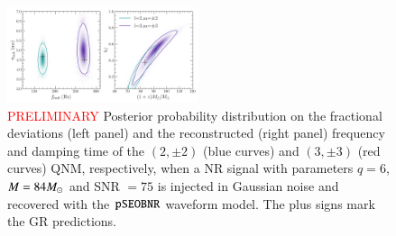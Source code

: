 
\begin{figure}
        \includegraphics[width=0.5\textwidth]{figures/nohair_sxs_0166.png}
        \caption{\textcolor{red}{PRELIMINARY} Posterior probability distribution on the fractional deviations (left panel) and the reconstructed (right panel) frequency and damping time of the $(2,\pm 2)$ (blue curves) and $(3,\pm 3)$ (red curves) QNM, respectively, when a NR signal with parameters $q=6$,  $M=84 M_{\odot}$ and SNR $=75$ is injected in Gaussian noise and recovered with the $\texttt{pSEOBNR}$ waveform model. The plus signs mark the GR predictions.}
        \label{fig:nohair_sxs}
\end{figure}
